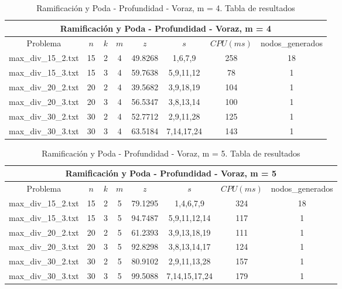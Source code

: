    \begin{table}[h]
   {\small
   \begin{center}
   \begin{tabular}{cccccccc}
      \multicolumn{8}{c}{Ramificación y Poda - Profundidad - Voraz, m = 4} \\
      \hline
      Problema & $n$ & $k$ & $m$ & $z$ & $s$ & $CPU(ms)$ & nodos\_generados \\
      \hline
      max\_div\_15\_2.txt & 15 & 2 & 4 & 49.8268 & 1,6,7,9 & 258 & 18 \\
      max\_div\_15\_3.txt & 15 & 3 & 4 & 59.7638 & 5,9,11,12 & 78 & 1 \\
      max\_div\_20\_2.txt & 20 & 2 & 4 & 39.5682 & 3,9,18,19 & 104 & 1 \\
      max\_div\_20\_3.txt & 20 & 3 & 4 & 56.5347 & 3,8,13,14 & 100 & 1 \\
      max\_div\_30\_2.txt & 30 & 2 & 4 & 52.7712 & 2,9,11,28 & 125 & 1 \\
      max\_div\_30\_3.txt & 30 & 3 & 4 & 63.5184 & 7,14,17,24 & 143 & 1 \\
      \hline
   \end{tabular}
   \end{center}
   }
   \caption{Ramificación y Poda - Profundidad - Voraz, m = 4. Tabla de resultados}
   \end{table}

   \begin{table}[h]
   {\small
   \begin{center}
   \begin{tabular}{cccccccc}
      \multicolumn{8}{c}{Ramificación y Poda - Profundidad - Voraz, m = 5} \\
      \hline
      Problema & $n$ & $k$ & $m$ & $z$ & $s$ & $CPU(ms)$ & nodos\_generados \\
      \hline
      max\_div\_15\_2.txt & 15 & 2 & 5 & 79.1295 & 1,4,6,7,9 & 324 & 18 \\
      max\_div\_15\_3.txt & 15 & 3 & 5 & 94.7487 & 5,9,11,12,14 & 117 & 1 \\
      max\_div\_20\_2.txt & 20 & 2 & 5 & 61.2393 & 3,9,13,18,19 & 111 & 1 \\
      max\_div\_20\_3.txt & 20 & 3 & 5 & 92.8298 & 3,8,13,14,17 & 124 & 1 \\
      max\_div\_30\_2.txt & 30 & 2 & 5 & 80.9102 & 2,9,11,13,28 & 157 & 1 \\
      max\_div\_30\_3.txt & 30 & 3 & 5 & 99.5088 & 7,14,15,17,24 & 179 & 1 \\
      \hline
   \end{tabular}
   \end{center}
   }
   \caption{Ramificación y Poda - Profundidad - Voraz, m = 5. Tabla de resultados}
   \end{table}

